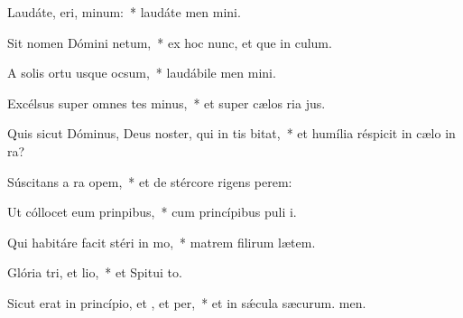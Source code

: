 \item Laudáte, eri, minum:~* laudáte men mini.
\item Sit nomen Dómini netum,~* ex hoc nunc, et que in culum.
\item A solis ortu usque  ocsum,~* laudábile men mini.
\item Excélsus super omnes tes minus,~* et super cælos ria jus.
\item Quis sicut Dóminus, Deus noster, qui in tis bitat,~* et humília réspicit in cælo  in ra?
\item Súscitans a ra opem,~* et de stércore rigens perem:
\item Ut cóllocet eum  prinpibus,~* cum princípibus puli i.
\item Qui habitáre facit stéri in mo,~* matrem filirum lætem.
\item Glória tri, et lio,~* et Spitui to.
\item Sicut erat in princípio, et , et per,~* et in sǽcula sæcurum. men.
